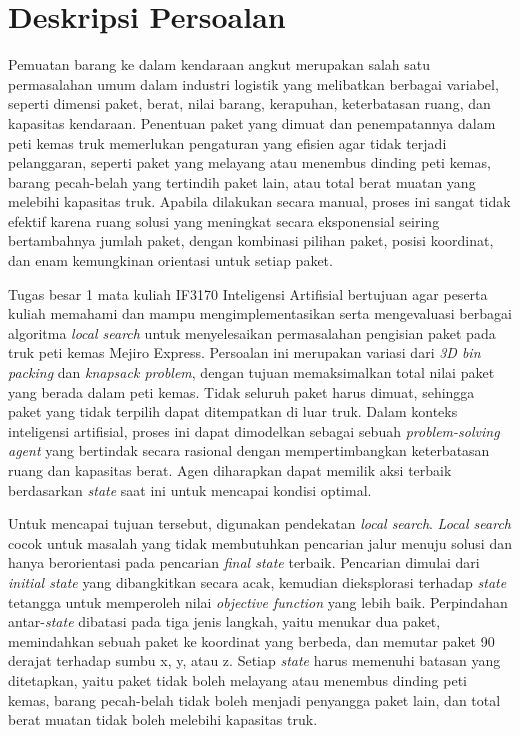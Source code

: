 \chapter{Deskripsi Persoalan}

Pemuatan barang ke dalam kendaraan angkut merupakan salah satu permasalahan umum dalam industri logistik yang melibatkan berbagai variabel, seperti dimensi paket, berat, nilai barang, kerapuhan, keterbatasan ruang, dan kapasitas kendaraan. Penentuan paket yang dimuat dan penempatannya dalam peti kemas truk memerlukan pengaturan yang efisien agar tidak terjadi pelanggaran, seperti paket yang melayang atau menembus dinding peti kemas, barang pecah-belah yang tertindih paket lain, atau total berat muatan yang melebihi kapasitas truk. Apabila dilakukan secara manual, proses ini sangat tidak efektif karena ruang solusi yang meningkat secara eksponensial seiring bertambahnya jumlah paket, dengan kombinasi pilihan paket, posisi koordinat, dan enam kemungkinan orientasi untuk setiap paket.

Tugas besar 1 mata kuliah IF3170 Inteligensi Artifisial bertujuan agar peserta kuliah memahami dan mampu mengimplementasikan serta mengevaluasi berbagai algoritma \textit{local search} untuk menyelesaikan permasalahan pengisian paket pada truk peti kemas Mejiro Express. Persoalan ini merupakan variasi dari \textit{3D bin packing} dan \textit{knapsack problem}, dengan tujuan memaksimalkan total nilai paket yang berada dalam peti kemas. Tidak seluruh paket harus dimuat, sehingga paket yang tidak terpilih dapat ditempatkan di luar truk. Dalam konteks inteligensi artifisial, proses ini dapat dimodelkan sebagai sebuah \textit{problem-solving agent} yang bertindak secara rasional dengan mempertimbangkan keterbatasan ruang dan kapasitas berat. Agen diharapkan dapat memilik aksi terbaik berdasarkan \textit{state} saat ini untuk mencapai kondisi optimal.

Untuk mencapai tujuan tersebut, digunakan pendekatan \textit{local search}. \textit{Local search} cocok untuk masalah yang tidak membutuhkan pencarian jalur menuju solusi dan hanya berorientasi pada pencarian \textit{final state} terbaik. Pencarian dimulai dari \textit{initial state} yang dibangkitkan secara acak, kemudian dieksplorasi terhadap \textit{state} tetangga untuk memperoleh nilai \textit{objective function} yang lebih baik. Perpindahan antar-\textit{state} dibatasi pada tiga jenis langkah, yaitu menukar dua paket, memindahkan sebuah paket ke koordinat yang berbeda, dan memutar paket 90 derajat terhadap sumbu x, y, atau z. Setiap \textit{state} harus memenuhi batasan yang ditetapkan, yaitu paket tidak boleh melayang atau menembus dinding peti kemas, barang pecah-belah tidak boleh menjadi penyangga paket lain, dan total berat muatan tidak boleh melebihi kapasitas truk.

